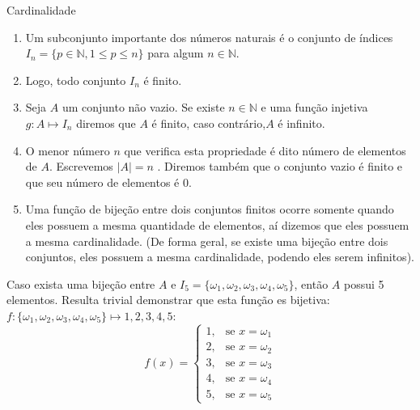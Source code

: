 \begin{frame}{Cardinalidade}
\begin{enumerate}
	\item  Um subconjunto importante dos números  naturais é o conjunto de índices  $I_n = \{ p \in \mathbb{N},1 \le p \le n \}$  para algum  $n \in \mathbb {N} .$
	
	\item Logo, todo conjunto  $I_n$  é finito.
	\item Seja $A$ um conjunto não vazio. Se existe $n \in \mathbb{N}$  e uma função injetiva  $g : A \mapsto I_n $ diremos que $A$ é finito, caso contrário,$A$ é infinito.
	\item O menor número $n$ que verifica esta propriedade é dito número de elementos de $A$. Escrevemos  $|A| = n$ . Diremos também que o conjunto vazio é finito e que seu número de elementos é 0.
	
	
	\item Uma função de bijeção entre dois conjuntos finitos ocorre somente quando eles possuem a mesma quantidade de elementos, aí dizemos que eles possuem a mesma cardinalidade. (De forma geral, se existe uma bijeção entre dois conjuntos, eles possuem a mesma cardinalidade, podendo eles serem infinitos).
	
\end{enumerate}

\begin{exem}
	Caso exista uma bijeção entre $A$ e  $I_5 = \{\omega_1, \omega_2, \omega_3, \omega_4, \omega_5 \} $, então $A$ possui 5 elementos. Resulta trivial demonstrar que esta função es bijetiva: $f: \{\omega_1, \omega_2, \omega_3, \omega_4, \omega_5 \}  \mapsto  {1,2,3,4,5}:$
	$$
	f(x) = \begin{cases} 
	1, & \text{se }x = \omega_1 \\ 
	2, & \text{se }x = \omega_2 \\ 
	3, & \text{se }x = \omega_3 \\
	4, & \text{se }x = \omega_4 \\
	5, & \text{se }x = \omega_5 
	\end{cases}
	$$
\end{exem}

\end{frame}

